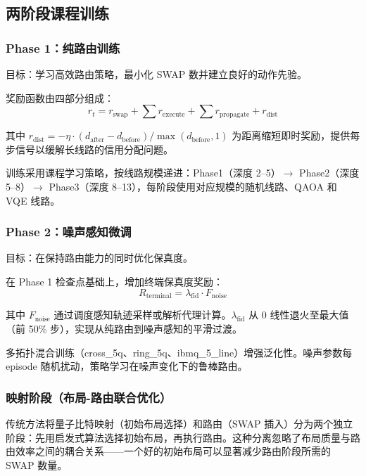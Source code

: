 \subsection{两阶段课程训练}

\subsubsection{Phase 1：纯路由训练}

目标：学习高效路由策略，最小化 SWAP 数并建立良好的动作先验。

奖励函数由四部分组成：
\begin{equation}
r_t = r_{\text{swap}} + \sum r_{\text{execute}} + \sum r_{\text{propagate}} + r_{\text{dist}}
\end{equation}

其中 $r_{\text{dist}} = -\eta \cdot (d_{\text{after}} - d_{\text{before}}) / \max(d_{\text{before}}, 1)$ 为距离缩短即时奖励，提供每步信号以缓解长线路的信用分配问题。

训练采用课程学习策略，按线路规模递进：Phase1（深度 2--5）$\to$ Phase2（深度 5--8）$\to$ Phase3（深度 8--13），每阶段使用对应规模的随机线路、QAOA 和 VQE 线路。

\subsubsection{Phase 2：噪声感知微调}

目标：在保持路由能力的同时优化保真度。

在 Phase 1 检查点基础上，增加终端保真度奖励：
\begin{equation}
R_{\text{terminal}} = \lambda_{\text{fid}} \cdot F_{\text{noise}}
\end{equation}

其中 $F_{\text{noise}}$ 通过调度感知轨迹采样或解析代理计算。$\lambda_{\text{fid}}$ 从 0 线性退火至最大值（前 50\% 步），实现从纯路由到噪声感知的平滑过渡。

多拓扑混合训练（cross\_5q、ring\_5q、ibmq\_5\_line）增强泛化性。噪声参数每 episode 随机扰动，策略学习在噪声变化下的鲁棒路由。

\subsubsection{映射阶段（布局-路由联合优化）}

传统方法将量子比特映射（初始布局选择）和路由（SWAP 插入）分为两个独立阶段：先用启发式算法选择初始布局，再执行路由。这种分离忽略了布局质量与路由效率之间的耦合关系——一个好的初始布局可以显著减少路由阶段所需的 SWAP 数量。


